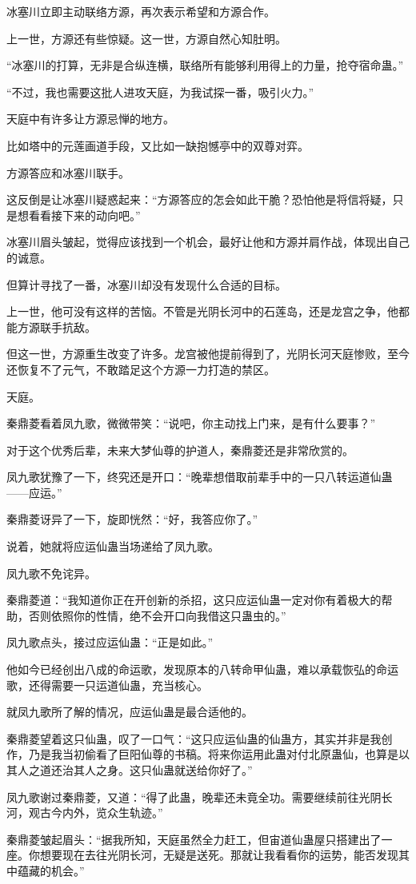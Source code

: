 \begin{this_body}
冰塞川立即主动联络方源，再次表示希望和方源合作。

上一世，方源还有些惊疑。这一世，方源自然心知肚明。

“冰塞川的打算，无非是合纵连横，联络所有能够利用得上的力量，抢夺宿命蛊。”

“不过，我也需要这批人进攻天庭，为我试探一番，吸引火力。”

天庭中有许多让方源忌惮的地方。

比如塔中的元莲画道手段，又比如一缺抱憾亭中的双尊对弈。

方源答应和冰塞川联手。

这反倒是让冰塞川疑惑起来：“方源答应的怎会如此干脆？恐怕他是将信将疑，只是想看看接下来的动向吧。”

冰塞川眉头皱起，觉得应该找到一个机会，最好让他和方源并肩作战，体现出自己的诚意。

但算计寻找了一番，冰塞川却没有发现什么合适的目标。

上一世，他可没有这样的苦恼。不管是光阴长河中的石莲岛，还是龙宫之争，他都能方源联手抗敌。

但这一世，方源重生改变了许多。龙宫被他提前得到了，光阴长河天庭惨败，至今还恢复不了元气，不敢踏足这个方源一力打造的禁区。

天庭。

秦鼎菱看着凤九歌，微微带笑：“说吧，你主动找上门来，是有什么要事？”

对于这个优秀后辈，未来大梦仙尊的护道人，秦鼎菱还是非常欣赏的。

凤九歌犹豫了一下，终究还是开口：“晚辈想借取前辈手中的一只八转运道仙蛊——应运。”

秦鼎菱讶异了一下，旋即恍然：“好，我答应你了。”

说着，她就将应运仙蛊当场递给了凤九歌。

凤九歌不免诧异。

秦鼎菱道：“我知道你正在开创新的杀招，这只应运仙蛊一定对你有着极大的帮助，否则依照你的性情，绝不会开口向我借这只蛊虫的。”

凤九歌点头，接过应运仙蛊：“正是如此。”

他如今已经创出八成的命运歌，发现原本的八转命甲仙蛊，难以承载恢弘的命运歌，还得需要一只运道仙蛊，充当核心。

就凤九歌所了解的情况，应运仙蛊是最合适他的。

秦鼎菱望着这只仙蛊，叹了一口气：“这只应运仙蛊的仙蛊方，其实并非是我创作，乃是我当初偷看了巨阳仙尊的书稿。将来你运用此蛊对付北原蛊仙，也算是以其人之道还治其人之身。这只仙蛊就送给你好了。”

凤九歌谢过秦鼎菱，又道：“得了此蛊，晚辈还未竟全功。需要继续前往光阴长河，观古今内外，览众生轨迹。”

秦鼎菱皱起眉头：“据我所知，天庭虽然全力赶工，但宙道仙蛊屋只搭建出了一座。你想要现在去往光阴长河，无疑是送死。那就让我看看你的运势，能否发现其中蕴藏的机会。”

\end{this_body}

